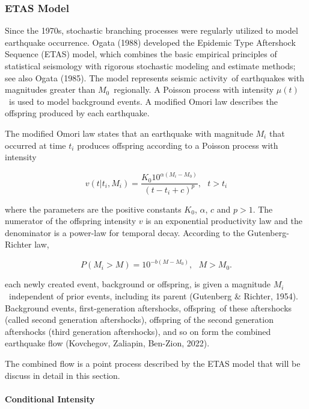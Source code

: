 \documentclass[12pt]{article} %
\theoremstyle{plain}
\begin{document}
		
	\subsubsection{ETAS Model}
	
	Since the 1970s, stochastic branching processes were regularly utilized to model earthquake occurrence. Ogata (1988) developed the Epidemic Type Aftershock Sequence (ETAS) model, which combines the basic empirical principles of statistical seismology with rigorous stochastic modeling and estimate methods; see also Ogata (1985). The model represents seismic activity of earthquakes with magnitudes greater than $M_0$ regionally. A Poisson process with intensity $\mu(t)$ is used to model background events. A modified Omori law describes the offspring produced by each earthquake.
	
	
	The modified Omori law states that an earthquake with magnitude $M_i$ that occurred at time $t_i$ produces offspring according to a Poisson process with intensity
	
	\begin{equation}
		v(t|t_i,M_i)=\frac{K_0 10^{\alpha (M_i-M_0)}}{(t-t_i+c)^p}, \ \ \ t>t_i
	\end{equation}

	\noindent where the parameters are the positive constants $K_0$, $\alpha$, $c$ and $p>1$. The numerator of the offspring intensity $v$ is an exponential productivity law and the denominator is a power-law for temporal decay. According to the Gutenberg-Richter law,
	
	\begin{equation}
		P(M_i>M) = 10^{-b(M-M_0)}, \ \ \ M>M_0.
	\end{equation}

	\noindent each newly created event, background or offspring, is given a magnitude $M_i$ independent of prior events, including its parent (Gutenberg \& Richter, 1954). Background events, first-generation aftershocks, offspring of these aftershocks (called second generation aftershocks), offspring of the second generation aftershocks (third generation aftershocks), and so on form the combined earthquake flow (Kovchegov, Zaliapin, Ben-Zion, 2022).
	
	The combined flow is a point process described by the ETAS model that will be discuss in detail in this section. 
	
	
	\paragraph{Conditional Intensity}
	
\end{document}
